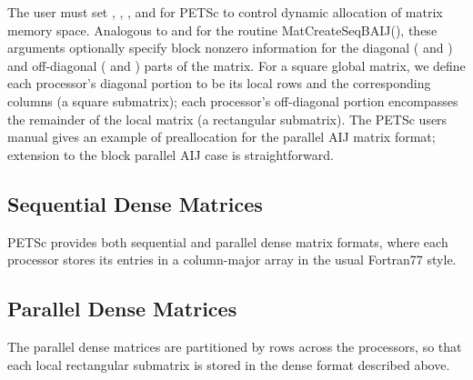 \documentclass[twoside,12pt]{../sty/report_petsc}
\begin{document}
The user must set , , , and
 for PETSc to control dynamic allocation of matrix
memory space.  Analogous to  and  for the routine
MatCreateSeqBAIJ(), these arguments optionally specify
block nonzero information for the diagonal ( and ) and
off-diagonal ( and ) parts of the matrix.
For a square global matrix, we define each processor's diagonal portion
to be its local rows and the corresponding columns (a square submatrix);
each processor's off-diagonal portion encompasses the remainder of the
local matrix (a rectangular submatrix).
The PETSc users manual gives an example of preallocation for
the parallel AIJ matrix format; extension to the block parallel AIJ case
is straightforward.

\subsection{Sequential Dense Matrices}

PETSc provides both sequential and parallel dense matrix formats,
where each processor stores its entries in a column-major array in the
usual Fortran77 style.

\subsection{Parallel Dense Matrices}

The parallel dense matrices are partitioned by rows across the
processors, so that each local rectangular submatrix is stored in the
dense format described above.



\end{document}
